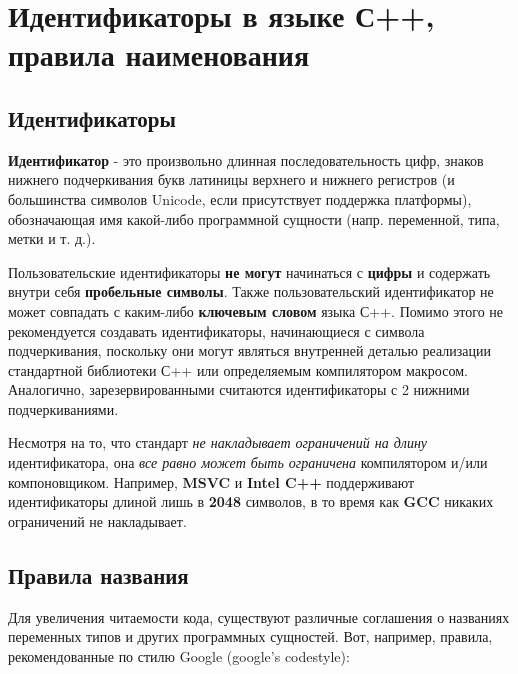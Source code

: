 \section{Идентификаторы в языке С++, правила наименования}

\subsection{Идентификаторы}

\textbf{Идентификатор} - это произвольно длинная последовательность
цифр, знаков нижнего подчеркивания букв латиницы верхнего и нижнего
регистров (и большинства символов Unicode, если присутствует поддержка
платформы), обозначающая имя какой-либо программной сущности (напр.
переменной, типа, метки и т. д.).

Пользовательские идентификаторы \textbf{не могут} начинаться с
\textbf{цифры} и содержать внутри себя \textbf{пробельные символы}.
Также пользовательский идентификатор не может совпадать с каким-либо
\textbf{ключевым словом} языка С++. Помимо этого не рекомендуется
создавать идентификаторы, начинающиеся с символа подчеркивания,
поскольку они могут являться внутренней деталью реализации стандартной
библиотеки С++ или определяемым компилятором макросом. Аналогично,
зарезервированными считаются идентификаторы с 2 нижними подчеркиваниями.

Несмотря на то, что стандарт \emph{не накладывает ограничений на длину}
идентификатора, она \emph{все равно может быть ограничена} компилятором
и/или компоновщиком. Например, \textbf{MSVC} и \textbf{Intel C++}
поддерживают идентификаторы длиной лишь в \textbf{2048} символов, в то
время как \textbf{GCC} никаких ограничений не накладывает.

\subsection{Правила названия}

Для увеличения читаемости кода, существуют различные соглашения о
названиях переменных типов и других программных сущностей. Вот,
например, правила, рекомендованные по стилю Google (google's codestyle):

